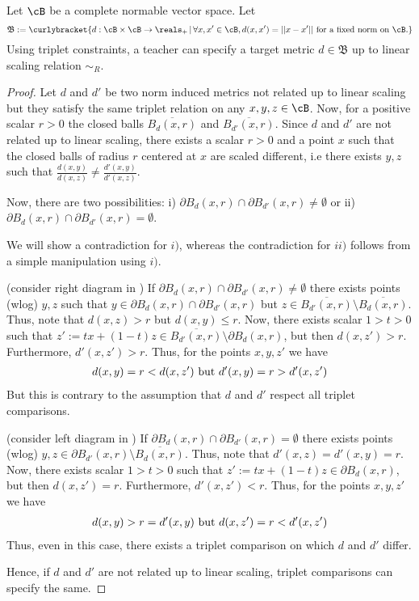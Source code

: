 \begin{theorem}
    Let $\cB$ be a complete normable vector space. Let $$\mathfrak{B}:= \curlybracket{d: \cB \times \cB \to \reals_{+}\,|\, \forall x,x' \in \cB, d(x, x') = ||x-x'|| \textnormal{ for a fixed norm on } \cB. }$$ 
    Using triplet constraints, a teacher can specify a target metric $d \in \mathfrak{B}$ up to linear scaling relation $\sim_R$. 
\end{theorem}
\begin{proof}
Let $d$ and $d'$ be two norm induced metrics not related up to linear scaling but they satisfy the same triplet relation on any $x,y,z \in \cB$. Now, for a positive scalar $r > 0$ the closed balls $\overline{B_{d}(x,r)}$ and $\overline{B_{d'}(x,r)}$. Since $d$ and $d'$ are not related up to linear scaling, there exists a scalar $r > 0$ and a point $x$ such that the closed balls of radius $r$ centered at $x$ are scaled different, i.e there exists $y,z$ such that $\frac{d(x,y)}{d(x,z)} \neq \frac{d'(x,y)}{d'(x,z)}$.

Now, there are two possibilities: i) $\partial{B_{d}(x,r)} \cap \partial{B_{d'}(x,r)} \neq \emptyset$ or ii) $\partial{B_{d}(x,r)} \cap \partial{B_{d'}(x,r)} = \emptyset$.

We will show a contradiction for $i)$, whereas the contradiction for $ii)$ follows from a simple manipulation using $i)$. 

(consider right diagram in )
If $\partial{B_{d}(x,r)} \cap \partial{B_{d'}(x,r)} \neq \emptyset$ there exists points (wlog) $y,z$ such that $y \in \partial{B_{d}(x,r)} \cap \partial{B_{d'}(x,r)}$ but $z \in \overline{B_{d'}(x,r)} \setminus \overline{B_{d}(x,r)}$. Thus, note that $d(x,z) > r$ but $d(x,y) \le r$. Now, there exists scalar $1> t > 0$ such that $z' := t x + (1-t) z \in \overline{B_{d'}(x,r)} \setminus \partial{B_{d}(x,r)}$, but then $d(x,z') > r$. Furthermore, $d'(x,z') > r$. Thus, for the points $x,y,z'$ we have
\begin{align*}
    d(x,y) = r < d(x,z') \textnormal{ but } d'(x,y) = r > d'(x,z')
\end{align*}
But this is contrary to the assumption that $d$ and $d'$ respect all triplet comparisons.

(consider left diagram in ) If $\partial{B_{d}(x,r)} \cap \partial{B_{d'}(x,r)} = \emptyset$ there exists points (wlog) $y,z \in \partial{B_{d'}(x,r)} \setminus \overline{B_{d}(x,r)}$. Thus, note that $d'(x,z) = d'(x,y) = r$. Now, there exists scalar $1> t > 0$ such that $z' := t x + (1-t) z \in \partial{B_{d}(x,r)}$, but then $d(x,z') = r$. Furthermore, $d'(x,z') < r$. Thus, for the points $x,y,z'$ we have
\begin{align*}
    d(x,y) > r = d'(x,y) \textnormal{ but } d(x,z') = r < d'(x,z')
\end{align*}
Thus, even in this case, there exists a triplet comparison on which $d$ and $d'$ differ.

Hence, if $d$ and $d'$ are not related up to linear scaling, triplet comparisons can specify the same.


\end{proof}

